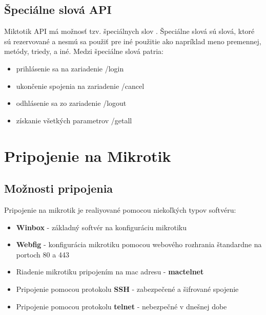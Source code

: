 \section{Špeciálne slová API}
Miktotik API má možnosť tzv. špeciálnych slov \cite{API}. Špeciálne slová sú slová, ktoré sú rezervované  a nesmú sa použiť pre iné použitie ako napríklad meno premennej, metódy, triedy, a iné. Medzi špeciálne slová patria:\begin{itemize}
\item prihlásenie sa na zariadenie \//login
\item ukončenie spojenia na zariadenie \//cancel
\item odhlásenie sa zo zariadenie \//logout
\item získanie všetkých parametrov \//getall
\end{itemize}   
\chapter{Pripojenie na Mikrotik}
\section{Možnosti pripojenia}
Pripojenie na mikrotik je realiyované pomocou niekoľkých typov softvéru:\begin{itemize}
\item \textbf{Winbox} - základný softvér na konfiguráciu mikrotiku
\item \textbf{Webfig} - konfigurácia mikrotiku pomocou webového rozhrania štandardne na portoch 80 a 443
\item Riadenie mikrotiku pripojením na mac adresu - \textbf{mactelnet}
\item Pripojenie pomocou protokolu \textbf{SSH} - zabezpečené a šifrované spojenie
\item Pripojenie pomocou protokolu \textbf{telnet} - nebezpečné v dnešnej dobe
\end{itemize}
